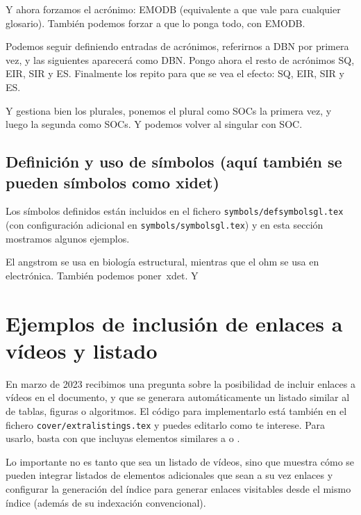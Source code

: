 \glsresetall[acronym]

Y ahora forzamos el acrónimo: \acs{EMODB} (equivalente a  que vale para cualquier glosario). También podemos forzar a que lo ponga todo, con \acf{EMODB}.


Podemos seguir definiendo entradas de acrónimos, referirnos a \ac{DBN} por primera vez, y las siguientes aparecerá como \ac{DBN}. Pongo ahora el resto de acrónimos \ac{SQ}, \ac{EIR}, \ac{SIR} y \ac{ES}. Finalmente los repito para que se vea el efecto: \ac{SQ}, \ac{EIR}, \ac{SIR} y \ac{ES}.

Y gestiona bien los plurales, ponemos el plural como \acp{SOC} la primera vez, y luego la segunda como \acp{SOC}. Y podemos volver al singular con \ac{SOC}.


\subsection{Definición y uso de símbolos (aquí también se pueden símbolos como \ac{xidet})}
\label{sec:simbolos}

Los símbolos definidos están incluidos en el fichero \texttt{symbols/defsymbolsgl.tex} (con configuración adicional en \texttt{symbols/symbolsgl.tex}) y en esta sección mostramos algunos ejemplos.

El \ac{angstrom} se usa en biología estructural, mientras que el \ac{ohm} se usa en electrónica. También podemos poner~\ac{xdet}. Y


\section{Ejemplos de inclusión de enlaces a vídeos y listado}
\label{sec:videolink}

En marzo de 2023 recibimos una pregunta sobre la posibilidad de incluir enlaces a vídeos en el documento, y que se generara automáticamente un listado similar al de tablas, figuras o algoritmos. El código para implementarlo está también en el fichero \texttt{cover/extralistings.tex} y puedes editarlo como te interese. Para usarlo, basta con que incluyas elementos similares a  o .

Lo importante no es tanto que sea un listado de vídeos, sino que muestra cómo se pueden integrar listados de elementos adicionales que sean a su vez enlaces y configurar la generación del índice para generar enlaces visitables desde el mismo índice (además de su indexación convencional).




